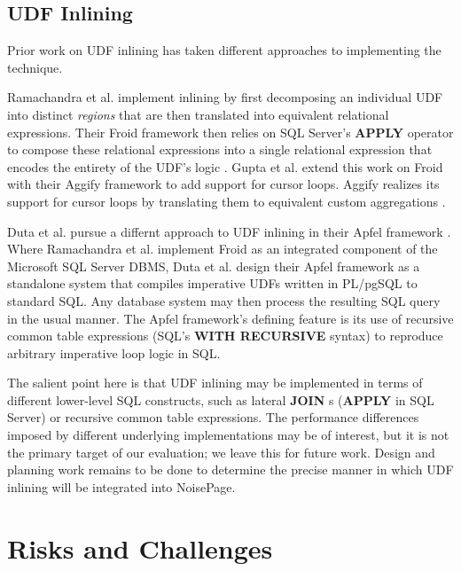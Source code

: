 \documentclass{vldb}
\newcommand{\dbCode}[1]{{\sffamily\small \textbf{#1}}\xspace}
\begin{document}
\subsection{UDF Inlining}

Prior work on UDF inlining has taken different approaches to implementing the technique.

Ramachandra et al. implement inlining by first decomposing an individual UDF into distinct \textit{regions} that are then translated into equivalent relational expressions. Their Froid framework then relies on SQL Server's \dbCode{APPLY} operator to compose these relational expressions into a single relational expression that encodes the entirety of the UDF's logic \cite{froid}. Gupta et al. extend this work on Froid with their Aggify framework to add support for cursor loops. Aggify realizes its support for cursor loops by translating them to equivalent custom aggregations \cite{aggify}. 

Duta et al. pursue a differnt approach to UDF inlining in their Apfel framework \cite{apfel}. Where Ramachandra et al. implement Froid as an integrated component of the Microsoft SQL Server DBMS, Duta et al. design their Apfel framework as a standalone system that compiles imperative UDFs written in PL/pgSQL to standard SQL. Any database system may then process the resulting SQL query in the usual manner. The Apfel framework's defining feature is its use of recursive common table expressions (SQL's \dbCode{WITH RECURSIVE} syntax) to reproduce arbitrary imperative loop logic in SQL.

The salient point here is that UDF inlining may be implemented in terms of different lower-level SQL constructs, such as lateral \dbCode{JOIN}s (\dbCode{APPLY} in SQL Server) or recursive common table expressions. The performance differences imposed by different underlying implementations may be of interest, but it is not the primary target of our evaluation; we leave this for future work. Design and planning work remains to be done to determine the precise manner in which UDF inlining will be integrated into NoisePage.


\section{Risks and Challenges}
\end{document}
